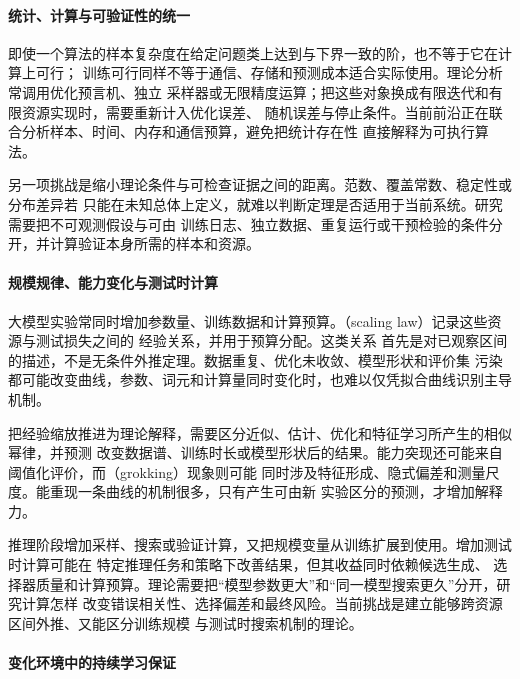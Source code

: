 \paragraph{统计、计算与可验证性的统一}

即使一个算法的样本复杂度在给定问题类上达到与下界一致的阶，也不等于它在计算上可行；
训练可行同样不等于通信、存储和预测成本适合实际使用。理论分析常调用优化预言机、独立
采样器或无限精度运算；把这些对象换成有限迭代和有限资源实现时，需要重新计入优化误差、
随机误差与停止条件。当前前沿正在联合分析样本、时间、内存和通信预算，避免把统计存在性
直接解释为可执行算法。

另一项挑战是缩小理论条件与可检查证据之间的距离。范数、覆盖常数、稳定性或分布差异若
只能在未知总体上定义，就难以判断定理是否适用于当前系统。研究需要把不可观测假设与可由
训练日志、独立数据、重复运行或干预检验的条件分开，并计算验证本身所需的样本和资源。

\paragraph{规模规律、能力变化与测试时计算}

大模型实验常同时增加参数量、训练数据和计算预算。（scaling law）记录这些资源与测试损失之间的
经验关系，并用于预算分配。这类关系
首先是对已观察区间的描述，不是无条件外推定理。数据重复、优化未收敛、模型形状和评价集
污染都可能改变曲线，参数、词元和计算量同时变化时，也难以仅凭拟合曲线识别主导机制。

把经验缩放推进为理论解释，需要区分近似、估计、优化和特征学习所产生的相似幂律，并预测
改变数据谱、训练时长或模型形状后的结果。能力突现还可能来自阈值化评价，而（grokking）现象则可能
同时涉及特征形成、隐式偏差和测量尺度。能重现一条曲线的机制很多，只有产生可由新
实验区分的预测，才增加解释力。

推理阶段增加采样、搜索或验证计算，又把规模变量从训练扩展到使用。增加测试时计算可能在
特定推理任务和策略下改善结果，但其收益同时依赖候选生成、
选择器质量和计算预算。理论需要把“模型参数更大”和“同一模型搜索更久”分开，研究计算怎样
改变错误相关性、选择偏差和最终风险。当前挑战是建立能够跨资源区间外推、又能区分训练规模
与测试时搜索机制的理论。

\paragraph{变化环境中的持续学习保证}

